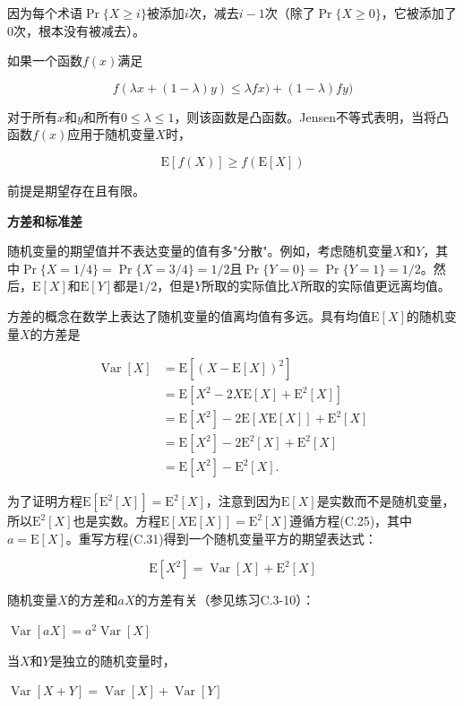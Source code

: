 \documentclass[lang=cn,newtx,10pt,scheme=chinese]{elegantbook}
\begin{document}
因为每个术语$\operatorname{Pr}\{X \geq i\}$被添加$i$次，减去$i-1$次（除了$\operatorname{Pr}\{X \geq 0\}$，它被添加了0次，根本没有被减去）。

如果一个函数$f(x)$满足

$$
f(\lambda x+(1-\lambda) y) \leq \lambda f x)+(1-\lambda) f y)
$$

对于所有$x$和$y$和所有$0 \leq \lambda \leq 1$，则该函数是凸函数。Jensen不等式表明，当将凸函数$f(x)$应用于随机变量$X$时，

$$
\mathrm{E}[f(X)] \geq f(\mathrm{E}[X])
$$

前提是期望存在且有限。

\textbf{方差和标准差}

随机变量的期望值并不表达变量的值有多"分散"。例如，考虑随机变量$X$和$Y$，其中$\operatorname{Pr}\{X=1 / 4\}=\operatorname{Pr}\{X=3 / 4\}=1 / 2$且$\operatorname{Pr}\{Y=0\}=\operatorname{Pr}\{Y=1\}=1 / 2$。然后，$\mathrm{E}[X]$和$\mathrm{E}[Y]$都是$1 / 2$，但是$Y$所取的实际值比$X$所取的实际值更远离均值。

方差的概念在数学上表达了随机变量的值离均值有多远。具有均值$\mathrm{E}[X]$的随机变量$X$的方差是

$$
\begin{aligned}
\operatorname{Var}[X] & =\mathrm{E}\left[(X-\mathrm{E}[X])^2\right] \\
& =\mathrm{E}\left[X^2-2 X \mathrm{E}[X]+\mathrm{E}^2[X]\right] \\
& =\mathrm{E}\left[X^2\right]-2 \mathrm{E}[X \mathrm{E}[X]]+\mathrm{E}^2[X] \\
& =\mathrm{E}\left[X^2\right]-2 \mathrm{E}^2[X]+\mathrm{E}^2[X] \\
& =\mathrm{E}\left[X^2\right]-\mathrm{E}^2[X] .
\end{aligned}
$$

为了证明方程$\mathrm{E}\left[\mathrm{E}^2[X]\right]=\mathrm{E}^2[X]$，注意到因为$\mathrm{E}[X]$是实数而不是随机变量，所以$\mathrm{E}^2[X]$也是实数。方程$\mathrm{E}[X \mathrm{E}[X]]=\mathrm{E}^2[X]$遵循方程(C.25)，其中$a=\mathrm{E}[X]$。重写方程(C.31)得到一个随机变量平方的期望表达式：

$$
\mathrm{E}\left[X^2\right]=\operatorname{Var}[X]+\mathrm{E}^2[X]
$$

随机变量$X$的方差和$aX$的方差有关（参见练习C.3-10）：

$\operatorname{Var}[a X]=a^2 \operatorname{Var}[X]$

当$X$和$Y$是独立的随机变量时，

$\operatorname{Var}[X+Y]=\operatorname{Var}[X]+\operatorname{Var}[Y]$
\end{document}
